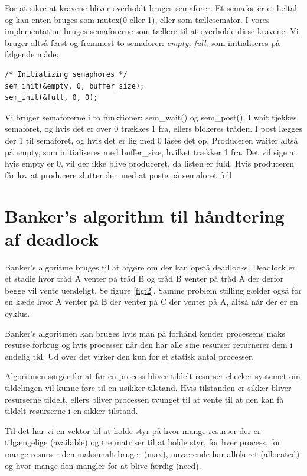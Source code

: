 \documentclass[danish]{report}
\begin{document}
For at sikre at kravene bliver overholdt bruges semaforer. Et semafor er et heltal og kan enten bruges som mutex(0 eller 1), eller som tællesemafor. I vores implementation bruges semaforerne som tællere til at overholde disse kravene. Vi bruger altså først og fremmest to semaforer: \textit{empty, full}, som initialiseres på følgende måde:

\begin{lstlisting}    
/* Initializing semaphores */
sem_init(&empty, 0, buffer_size);
sem_init(&full, 0, 0);
\end{lstlisting}

Vi bruger semaforerne i to funktioner; sem_wait() og sem_post(). I wait tjekkes semaforet, og hvis det er over 0 trækkes 1 fra, ellers blokeres tråden. I post lægges der 1 til semaforet, og hvis det er lig med 0 låses det op. Produceren waiter altså på empty, som initialiseres med buffer_size, hvilket trækker 1 fra. Det vil sige at hvis empty er 0, vil der ikke blive produceret, da listen er fuld. Hvis produceren får lov at producere slutter den med at poste på semaforet full


\chapter{Banker’s algorithm til håndtering af deadlock}

Banker's algoritme bruges til at afgøre om der kan opstå deadlocks. Deadlock er et stadie hvor tråd A venter på tråd B og tråd B venter på tråd A der derfor begge vil vente uendeligt. Se figure \ref{fig:2}. Samme problem stilling gælder også for en kæde hvor A venter på B der venter på C der venter på A, altså når der er en cyklus.

Banker's algoritmen kan bruges hvis man på forhånd kender processens maks resurse forbrug og hvis processer når den har alle sine resurser returnerer dem i endelig tid. Ud over det virker den kun for et statisk antal processer.


Algoritmen sørger for at før en process bliver tildelt resurser checker systemet om tildelingen vil kunne føre til en usikker tilstand. Hvis tilstanden er sikker bliver resurserne tildelt, ellers bliver processen tvunget til at vente til at den kan få tildelt resurserne i en sikker tilstand.

Til det har vi en vektor til at holde styr på hvor mange resurser der er tilgængelige (available) og tre matriser til at holde styr, for hver process, for mange resurser den maksimalt bruger (max), nuværende har allokeret (allocated) og hvor mange den mangler for at blive færdig (need).
\end{document}
